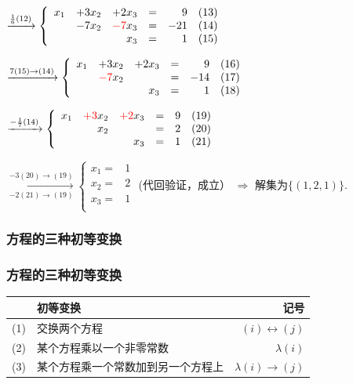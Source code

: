 \begin{frame}\frametitle{}
{ $\xrightarrow{\frac16(12)}\left\{\begin{array}{rrrrrr}
x_1 & +3x_2 & +2x_3 & =&   9 & (13)\\
& -7x_2 & \red{-7}x_3 & =& -21 & (14)\\
&       &  x_3 & =&   1 & (15)\\
\end{array}\right. $}\\[2mm]
\pp
\bigskip

{ $\xrightarrow{7(15)\rightarrow(14)}\left\{\begin{array}{rrrrrr}
x_1 & +3x_2 & +2x_3 & =&   9 & (16)\\
& \red{-7}x_2 &      & =& -14 & (17)\\
&       &  x_3 & =&   1 & (18)\\
\end{array}\right. $} \\[2mm]
\pp
\bigskip

{ $\xrightarrow{-\frac17(14)}\left\{\begin{array}{rrrrrr}
x_1 & \red{+3}x_2 & \red{+2}x_3  & =&   9 & (19)\\
& x_2 &         &   =& 2 & (20)\\
&       &  x_3 & =&   1 & (21)\\
\end{array}\right. $}\\[2mm]
\pp
\bigskip

{$\xrightarrow[-2(21)\rightarrow (19)]{-3(20)\rightarrow (19)}\left\{\begin{array}{rr}
x_1 =&   1\\
x_2 =& 2 \\
x_3 =&   1\\
\end{array}\right. $ \pp
(代回验证，成立） $\Rightarrow$ 解集为$\{(1,2,1)\}$.}
\end{frame}





\subsubsection{方程的三种初等变换}
\begin{frame}\frametitle{方程的三种初等变换}
\begin{tabular}{r||l|r}
&初等变换 & 记号\\\hline\hline
(1) & 交换两个方程 & $(i)\leftrightarrow(j)$\\\hline
(2) & 某个方程乘以一个非零常数 & $\lambda(i)$\\\hline
(3) & 某个方程乘一个常数加到另一个方程上 & $\lambda(i)\rightarrow (j)$\\
\end{tabular}
\end{frame}





